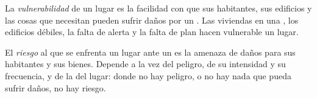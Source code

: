 \begin{definition}[Vulnerabilidad]\label{def:g9:natural-risks:vulnerability}
La \emph{vulnerabilidad} de un lugar es la facilidad
con que sus habitantes, sus edificios y las cosas que necesitan pueden
sufrir daños por un . Las viviendas en una , los edificios débiles, la falta de alerta y la falta de plan
hacen vulnerable un lugar.
\end{definition}

\begin{definition}[Riesgo]\label{def:g9:natural-risks:risk}
El \emph{riesgo} al que se enfrenta un lugar ante un  es la amenaza de daños para sus habitantes y sus bienes. Depende a
la vez del peligro, de su intensidad y su frecuencia, y de la
 del lugar: donde no hay peligro, o no hay nada que pueda
sufrir daños, no hay riesgo.
\end{definition}

